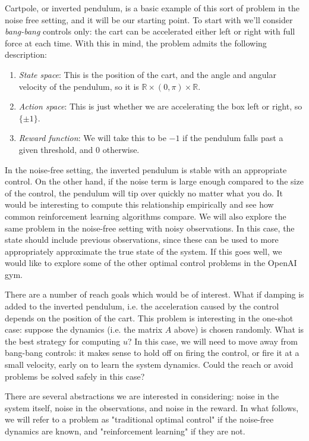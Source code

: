 \documentclass{article}
\begin{document}
Cartpole, or inverted pendulum, is a basic example of this sort of problem in the noise free setting, and it will be our starting point. To start with we'll consider {\em bang-bang} controls only: the cart can be accelerated either left or right with full force at each time. With this in mind, the problem admits the following description:
\begin{enumerate}
    \item []{\em State space}: This is the position of the cart, and the angle and angular velocity of the pendulum, so it is $\mathbb R \times (0,\pi) \times \mathbb R$.
    \item []{\em Action space}: This is just whether we are accelerating the box left or right, so $\{\pm 1\}$.
    \item []{\em Reward function}: We will take this to be $-1$ if the pendulum falls past a given threshold, and $0$ otherwise.
\end{enumerate}

In the noise-free setting, the inverted pendulum is stable with an appropriate control. On the other hand, if the noise term is large enough compared to the size of the control, the pendulum will tip over quickly no matter what you do. It would be interesting to compute this relationship empirically and see how common reinforcement learning algorithms compare.
We will also explore the same problem in the noise-free setting with noisy observations. In this case, the state should include previous observations, since these can be used to more appropriately approximate the true state of the system.
If this goes well, we would like to explore some of the other optimal control problems in the OpenAI gym.

There are a number of reach goals which would be of interest. What if damping is added to the inverted pendulum, i.e. the acceleration caused by the control depends on the position of the cart. This problem is interesting in the one-shot case: suppose the dynamics (i.e. the matrix $A$ above) is chosen randomly. What is the best strategy for computing $u$? In this case, we will need to move away from bang-bang controls: it makes sense to hold off on firing the control, or fire it at a small velocity, early on to learn the system dynamics. Could the reach or avoid problems be solved safely in this case?

There are several abstractions we are interested in considering: noise in the system itself, noise in the observations, and noise in the reward. In what follows, we will refer to a problem as "traditional optimal control" if the noise-free dynamics are known, and "reinforcement learning" if they are not. 
\end{document}
